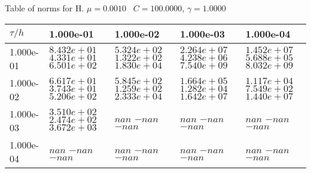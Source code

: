 \begin{center}
Table of norms for H. $\mu = 0.0010$ \, $C = 100.0000$, $\gamma = 1.0000$
  
\begin{tabular}{|p{1in}|p{1in}|p{1in}|p{1in}|p{1in}|} \hline
$\tau / h$ &1.000e-01 &1.000e-02 &1.000e-03 &1.000e-04 \\ \hline 
1.000e-01 & $8.432e+01$  $4.331e+01$  $6.501e+02$  & $5.324e+02$  $1.322e+02$  $1.830e+04$  & $2.264e+07$  $4.238e+06$  $7.540e+09$  & $1.452e+07$  $5.688e+05$  $8.032e+09$  \\ \hline 
1.000e-02 & $6.617e+01$  $3.743e+01$  $5.206e+02$  & $5.845e+02$  $1.259e+02$  $2.333e+04$  & $1.664e+05$  $1.282e+04$  $1.642e+07$  & $1.117e+04$  $7.549e+02$  $1.440e+07$  \\ \hline 
1.000e-03 & $3.510e+02$  $2.474e+02$  $3.672e+03$  & $nan$  $-nan$  $-nan$  & $nan$  $-nan$  $-nan$  & $nan$  $-nan$  $-nan$  \\ \hline 
1.000e-04 & $nan$  $-nan$  $-nan$  & $nan$  $-nan$  $-nan$  & $nan$  $-nan$  $-nan$  & $nan$  $-nan$  $-nan$  \\ \hline 

\end{tabular}\\[20pt]
\end{center}

